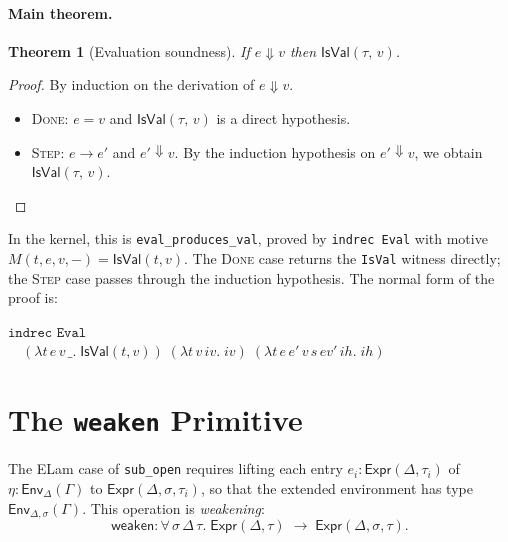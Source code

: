 \documentclass[10pt,a4paper]{article}
\newcommand{\IsVal}[2]{\mathsf{IsVal}(#1,\,#2)} %
\newcommand{\step}{\to}
\newcommand{\eval}{\Downarrow}
\newcommand{\SemEnvD}[2]{\mathsf{Env}_{#1}(#2)}
\theoremstyle{plain}
\newtheorem{theorem}{Theorem}
\theoremstyle{definition}
\theoremstyle{remark}
\begin{document}
\paragraph{Main theorem.}

\begin{theorem}[Evaluation soundness]\label{thm:sound}
If\/ $e \eval v$ then $\IsVal{\tau}{v}$.
\end{theorem}
\begin{proof}
By induction on the derivation of $e \eval v$.
\begin{itemize}\itemsep2pt
  \item \textsc{Done}: $e = v$ and $\IsVal{\tau}{v}$ is a direct hypothesis.
  \item \textsc{Step}: $e \step e'$ and $e' \eval v$.
        By the induction hypothesis on $e' \eval v$, we obtain
        $\IsVal{\tau}{v}$. \qedhere
\end{itemize}
\end{proof}

\noindent
In the kernel, this is \texttt{eval\_produces\_val}, proved by
\texttt{indrec Eval} with motive $M(t,e,v,-) = \mathsf{IsVal}(t,v)$.
The \textsc{Done} case returns the \texttt{IsVal} witness directly;
the \textsc{Step} case passes through the induction hypothesis.
The normal form of the proof is:
\begin{center}
\small
$\texttt{indrec Eval}$\\[2pt]
$\quad(\lambda t\,e\,v\,\_.\;\mathsf{IsVal}(t,v))\;
(\lambda t\,v\,\mathit{iv}.\;\mathit{iv})\;
(\lambda t\,e\,e'\,v\,s\,\mathit{ev'}\,\mathit{ih}.\;\mathit{ih})$
\end{center}

\section{The \texttt{weaken} Primitive}
\label{sec:weaken}

The ELam case of \texttt{sub\_open} requires lifting each entry
$e_i : \mathsf{Expr}(\Delta,\tau_i)$ of $\eta : \SemEnvD{\Delta}{\Gamma}$
to $\mathsf{Expr}(\Delta,\sigma,\tau_i)$, so that the extended environment
has type $\SemEnvD{\Delta,\sigma}{\Gamma}$.  This operation is
\emph{weakening}:
\[
  \mathsf{weaken} : \forall\,\sigma\,\Delta\,\tau.\;
  \mathsf{Expr}(\Delta,\tau) \;\longrightarrow\; \mathsf{Expr}(\Delta,\sigma,\tau).
\]
\end{document}
